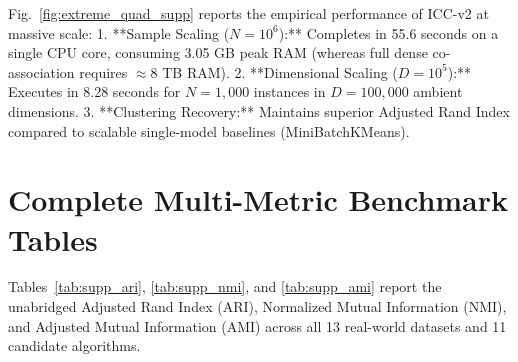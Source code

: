 \documentclass[10pt,journal,compsoc]{IEEEtran}
\begin{document}
Fig.~\ref{fig:extreme_quad_supp} reports the empirical performance of ICC-v2 at massive scale:
1. **Sample Scaling ($N = 10^6$):** Completes in 55.6 seconds on a single CPU core, consuming 3.05 GB peak RAM (whereas full dense co-association requires $\approx 8$ TB RAM).
2. **Dimensional Scaling ($D = 10^5$):** Executes in 8.28 seconds for $N = 1{,}000$ instances in $D = 100{,}000$ ambient dimensions.
3. **Clustering Recovery:** Maintains superior Adjusted Rand Index compared to scalable single-model baselines (MiniBatchKMeans).


\section{Complete Multi-Metric Benchmark Tables}\label{sec:tables_supp}

Tables~\ref{tab:supp_ari}, \ref{tab:supp_nmi}, and \ref{tab:supp_ami} report the unabridged Adjusted Rand Index (ARI), Normalized Mutual Information (NMI), and Adjusted Mutual Information (AMI) across all 13 real-world datasets and 11 candidate algorithms.



\nocite{strehl2002cluster,fred2005combining,li2019determinacy,fern2004solving,topchy2005clustering}


\end{document}
